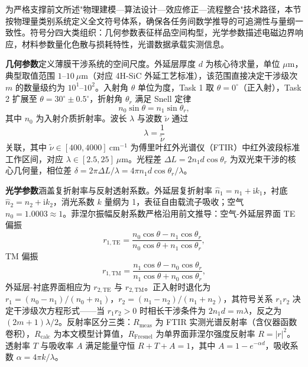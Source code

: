 \documentclass{mcmthesis}
\begin{document}
为严格支撑前文所述"物理建模—算法设计—效应修正—流程整合"技术路径，本节按物理量类别系统定义全文符号体系，确保各任务间数学推导的可追溯性与量纲一致性。符号分四大类组织：几何参数表征样品空间构型，光学参数描述电磁边界响应，材料参数量化色散与损耗特性，光谱数据承载实测信息。

\textbf{几何参数}定义薄膜干涉系统的空间尺度。外延层厚度 $d$ 为核心待求量，单位 $\mu\text{m}$，典型取值范围 $1$–$10~\mu\text{m}$（对应 4H-SiC 外延工艺标准），该范围直接决定干涉级次 $m$ 的数量级约为 $10^1$–$10^2$。入射角 $\theta$ 单位为度，Task 1 取 $\theta = 0^{\circ}$（正入射），Task 2 扩展至 $\theta = 30^{\circ} \pm 0.5^{\circ}$，折射角 $\theta_r$ 满足 Snell 定律
\begin{equation}\label{eq:snell}
n_0\sin\theta = n_1\sin\theta_r,
\end{equation}
其中 $n_0$ 为入射介质折射率。波长 $\lambda$ 与波数 $\tilde{\nu}$ 通过
\begin{equation}\label{eq:wavenumber}
\lambda = \frac{1}{\tilde{\nu}}
\end{equation}
关联，其中 $\tilde{\nu} \in [400, 4000]~\text{cm}^{-1}$ 为傅里叶红外光谱仪（FTIR）中红外波段标准工作区间，对应 $\lambda \in [2.5, 25]~\mu\text{m}$。光程差 $\Delta L = 2n_1 d\cos\theta_r$ 为双光束干涉的核心几何量，相位差 $\delta = 2\pi\Delta L/\lambda = 4\pi n_1 d\cos\theta_r/\lambda$。

\textbf{光学参数}涵盖复折射率与反射透射系数。外延层复折射率 $\hat{n}_1 = n_1 + \mathrm{i}k_1$，衬底 $\hat{n}_2 = n_2 + \mathrm{i}k_2$，消光系数 $k$ 量纲为 1，表征自由载流子吸收；空气 $n_0 = 1.0003 \approx 1$。菲涅尔振幅反射系数严格沿用前文推导：空气-外延层界面 TE 偏振
\begin{equation}\label{eq:fresnel_r1}
r_{1,\text{TE}} = \frac{n_0\cos\theta - n_1\cos\theta_r}{n_0\cos\theta + n_1\cos\theta_r},
\end{equation}
TM 偏振
\begin{equation}\label{eq:fresnel_r1_tm}
r_{1,\text{TM}} = \frac{n_1\cos\theta - n_0\cos\theta_r}{n_1\cos\theta + n_0\cos\theta_r},
\end{equation}
外延层-衬底界面相应为 $r_{2,\text{TE}}$ 与 $r_{2,\text{TM}}$。正入射时退化为 $r_1 = (n_0 - n_1)/(n_0 + n_1)$，$r_2 = (n_1 - n_2)/(n_1 + n_2)$，其符号关系 $r_1 r_2$ 决定干涉级次方程形式——当 $r_1 r_2 > 0$ 时相长干涉条件为 $2n_1 d = m\lambda$，反之为 $(2m+1)\lambda/2$。反射率区分三类：$R_{\text{meas}}$ 为 FTIR 实测光谱反射率（含仪器函数卷积），$R_{\text{calc}}$ 为本文模型计算值，$R_{\text{Fresnel}}$ 为单界面菲涅尔强度反射率 $R = |r|^2$。透射率 $T$ 与吸收率 $A$ 满足能量守恒 $R + T + A = 1$，其中 $A = 1 - e^{-\alpha d}$，吸收系数 $\alpha = 4\pi k/\lambda$。
\end{document}
